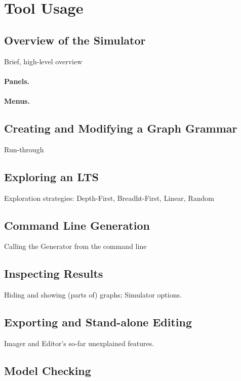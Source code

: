 \section{Tool Usage}

\subsection{Overview of the Simulator}

Brief, high-level overview

\paragraph{Panels.}

\paragraph{Menus.}

\subsection{Creating and Modifying a Graph Grammar}

Run-through

\subsection{Exploring an LTS}

Exploration strategies: Depth-First, Breadht-First, Linear, Random

\subsection{Command Line Generation}

Calling the Generator from the command line

\subsection{Inspecting Results}

Hiding and showing (parts of) graphs; Simulator options.

\subsection{Exporting and Stand-alone Editing}

Imager and Editor's so-far unexplained features.

\subsection{Model Checking}

